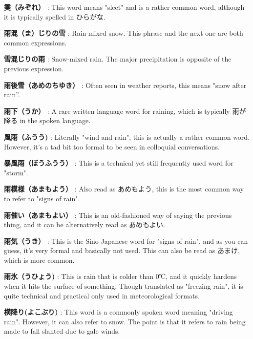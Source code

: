 \par{\textbf{霙（みぞれ） }: This word means "sleet" and is a rather common word, although it is typically spelled in ひらがな. }

\par{\textbf{雨混（ま）じりの雪 }: Rain-mixed snow. This phrase and the next one are both common expressions. }

\par{\textbf{雪混じりの雨 }: Snow-mixed rain. The major precipitation is opposite of the previous expression. }

\par{\textbf{雨後雪（あめのちゆき） }: Often seen in weather reports, this means "snow after rain”. }

\par{\textbf{雨下（うか） }: A rare written language word for raining, which is typically 雨が降る in the spoken language. }

\par{\textbf{風雨（ふうう) }: Literally "wind and rain", this is actually a rather common word. However, it's a tad bit too formal to be seen in colloquial conversations. }

\par{\textbf{暴風雨（ぼうふうう） }: This is a technical yet still frequently used word for "storm". }

\par{\textbf{雨模様（あまもよう） }: Also read as あめもよう, this is the most common way to refer to "signs of rain". }

\par{\textbf{雨催い（あまもよい） }: This is an old-fashioned way of saying the previous thing, and it can be alternatively read as あめもよい. }

\par{\textbf{雨気（うき） }: This is the Sino-Japanese word for "signs of rain", and as you can guess, it's very formal and basically not used. This can also be read as あまけ, which is more common. }

\par{\textbf{雨氷（うひょう) }: This is rain that is colder than 0℃, and it quickly hardens when it hits the surface of something. Though translated as "freezing rain", it is quite technical and practical only used in meteorological formats. }

\par{\textbf{横降り(よこぶり) }: This word is a commonly spoken word meaning "driving rain". However, it can also refer to snow. The point is that it refers to rain being made to fall slanted due to gale winds. }

